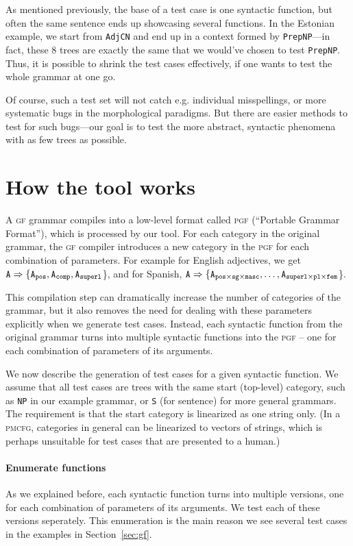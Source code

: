 \documentclass[11pt]{article}
\def\t#1{\texttt{#1}}
\def\gf{\textsc{gf}}
\def\pgf{\textsc{pgf}}
\def\pmcfg{\textsc{pmcfg}}
\begin{document}
As mentioned previously, the base of a test case is one syntactic
function, but often the same sentence ends up showcasing several
functions. In the Estonian example, we start from \t{AdjCN} 
and end up in a context formed by \t{PrepNP}---in fact, these 8 trees
are exactly the same that we would've chosen to test \t{PrepNP}. Thus,
it is possible to shrink the test cases effectively, if one wants to
test the whole grammar at one go.

Of course, such a test set will not catch e.g. individual
misspellings, or more systematic bugs in the morphological
paradigms. But there are easier methods to test for such bugs---our 
goal is to test the more abstract, syntactic phenomena with as few
trees as possible.  

\section{How the tool works}
\label{sec:details}

A \gf{} grammar compiles into a low-level format called \pgf{}
(``Portable Grammar Format''), which is processed by our tool. For
each category in the original grammar, the \gf{} compiler introduces a
new category in the \pgf{} for each combination of parameters. For
example for English adjectives, we get ${\tt A \Rightarrow \{ \tt A_{pos}, A_{comp}, A_{superl}}$\}, and for Spanish,
${\tt A \Rightarrow \{ A_{pos\times{}sg\times{}masc}, \dots, A_{superl\times{}pl\times{}fem}}$\}. 

This compilation step can dramatically increase the number of categories of the grammar, but it also removes the need for dealing with these parameters explicitly when we generate test cases. Instead, each syntactic function from the original grammar turns into multiple syntactic functions into the \pgf{} -- one for each combination of parameters of its arguments.

We now describe the generation of test cases for a given syntactic function. We assume that all test cases are trees with the same start (top-level) category, such as \t{NP} in our example grammar, or \t{S} (for sentence) for more general grammars. The requirement is that the start category is linearized as one string only. (In a \pmcfg{}, categories in general can be linearized to vectors of strings, which is perhaps unsuitable for test cases that are presented to a human.)

\paragraph{Enumerate functions} As we explained before, each syntactic function turns into multiple versions, one for each combination of parameters of its arguments. We test each of these versions seperately. This enumeration is the main reason we see several test cases in the examples in Section~\ref{sec:gf}.
\end{document}
